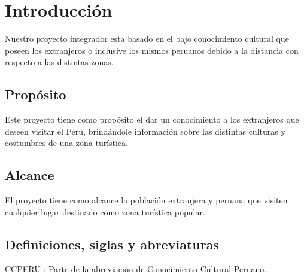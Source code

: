 \chapter{Introducción}
Nuestro proyecto integrador esta basado en el bajo conocimiento cultural que poseen los extranjeros o inclusive los mismos peruanos debido a la distancia con respecto a las distintas zonas.
\section{Propósito}
Este proyecto tiene como propósito el dar un conocimiento a los extranjeros que deseen visitar el Perú, brindándole información sobre las distintas culturas y costumbres de una zona turística.
\section{Alcance}
El proyecto tiene como alcance la población extranjera y peruana que visiten cualquier lugar destinado como zona turística popular.
\section{Definiciones, siglas y abreviaturas}
CCPERU : Parte de la abreviación de Conocimiento Cultural Peruano.
